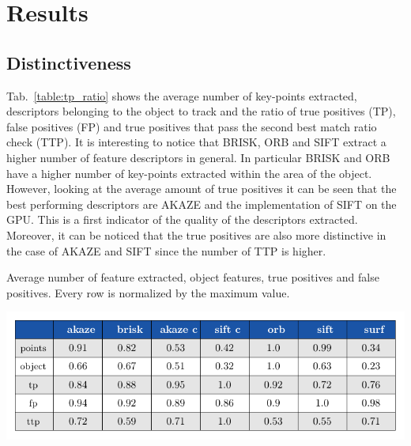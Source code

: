 \section{Results}

\subsection{Distinctiveness}


Tab.~\ref{table:tp_ratio} shows the average number of key-points extracted, descriptors belonging to the object to track and the ratio of true positives (TP), false positives (FP) and true positives that pass the second best match ratio check (TTP). It is interesting to notice that BRISK, ORB and SIFT extract a higher number of feature descriptors in general. In particular BRISK and ORB have a higher number of key-points extracted within the area of the object. However, looking at the average amount of true positives it can be seen that the best performing descriptors are AKAZE and the implementation of SIFT on the GPU. This is a first indicator of the quality of the descriptors extracted. Moreover, it can be noticed that the true positives are also more distinctive in the case of AKAZE and SIFT since the number of TTP is higher.

\begin{table}[h]
\caption{Average number of feature extracted, object features, true positives and false positives. Every row is normalized by the maximum value.}
\vspace{-2mm} 
\centerline{%
		\includegraphics[width=0.98\linewidth]{tables/descriptivness_ratio.pdf}}
    \vspace{-2mm} 
	\label{table:tp_ratio}
\end{table}

